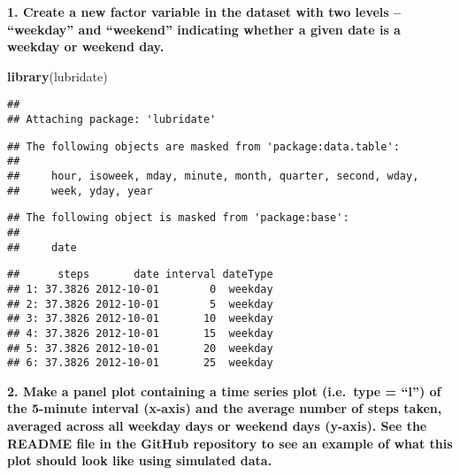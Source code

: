 \documentclass[]{article}
\newenvironment{Shaded}{\begin{snugshade}}{\end{snugshade}}
\newcommand{\KeywordTok}[1]{\textcolor[rgb]{0.13,0.29,0.53}{\textbf{#1}}}
\newcommand{\NormalTok}[1]{#1}
\newcommand{\OperatorTok}[1]{\textcolor[rgb]{0.81,0.36,0.00}{\textbf{#1}}}
\newcommand{\StringTok}[1]{\textcolor[rgb]{0.31,0.60,0.02}{#1}}
\begin{document}
\textbf{1. Create a new factor variable in the dataset with two levels
-- ``weekday'' and ``weekend'' indicating whether a given date is a
weekday or weekend day.}

\begin{Shaded}
\begin{Highlighting}[]
\KeywordTok{library}\NormalTok{(lubridate)}
\end{Highlighting}
\end{Shaded}

\begin{verbatim}
## 
## Attaching package: 'lubridate'
\end{verbatim}

\begin{verbatim}
## The following objects are masked from 'package:data.table':
## 
##     hour, isoweek, mday, minute, month, quarter, second, wday,
##     week, yday, year
\end{verbatim}

\begin{verbatim}
## The following object is masked from 'package:base':
## 
##     date
\end{verbatim}

\begin{Shaded}
\end{Shaded}

\begin{verbatim}
##      steps       date interval dateType
## 1: 37.3826 2012-10-01        0  weekday
## 2: 37.3826 2012-10-01        5  weekday
## 3: 37.3826 2012-10-01       10  weekday
## 4: 37.3826 2012-10-01       15  weekday
## 5: 37.3826 2012-10-01       20  weekday
## 6: 37.3826 2012-10-01       25  weekday
\end{verbatim}

\textbf{2. Make a panel plot containing a time series plot
(i.e.~\color{red}{\verb|type = "l"|}type = ``l'') of the 5-minute
interval (x-axis) and the average number of steps taken, averaged across
all weekday days or weekend days (y-axis). See the README file in the
GitHub repository to see an example of what this plot should look like
using simulated data.}
\end{document}
